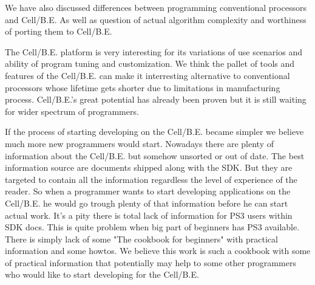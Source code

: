 \par
We have also discussed differences between programming conventional processors and Cell/B.E.
As well as question of actual algorithm complexity and worthiness of porting them to Cell/B.E.

\par
The Cell/B.E. platform is very interesting for its variations of use scenarios and ability of program tuning and customization.
We think the pallet of tools and features of the Cell/B.E. can make it interresting alternative to conventional processors whose lifetime gets shorter due to limitations in manufacturing process.
Cell/B.E.'s great potential has already been proven but it is still waiting for wider spectrum of programmers.

\par
If the process of starting developing on the Cell/B.E. became simpler we believe much more new programmers would start.
Nowadays there are plenty of information about the Cell/B.E. but somehow unsorted or out of date.
The best information source are documents shipped along with the SDK.
But they are targeted to contain all the information regardless the level of experience of the reader.
So when a programmer wants to start developing applications on the Cell/B.E. he would go trough plenty of that information before he can start actual work.
It's a pity there is total lack of information for PS3 users within SDK docs.
This is quite problem when big part of beginners has PS3 available.
There is simply lack of some "The cookbook for beginners" with practical information and some howtos.
We believe this work is such a cookbook with some of practical information that potentially may help to some other programmers who would like to start developing for the Cell/B.E.
